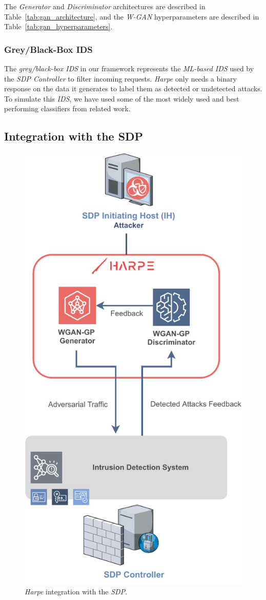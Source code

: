 The \textit{Generator} and \textit{Discriminator} architectures are described in Table~\ref{tab:gan_architecture},
and the \textit{W-GAN} hyperparameters are described in Table~\ref{tab:gan_hyperparameters}.

\subsubsection{Grey/Black-Box IDS}
The \textit{grey/black-box IDS} in our framework represents the \textit{ML-based IDS} used by the
\textit{SDP Controller} to filter incoming requests.
\textit{Harpe} only needs a binary response on the data it generates to label them as detected or undetected attacks.
To simulate this \textit{IDS}, we have used some of the most widely used and best performing classifiers from related
work.

\subsection{Integration with the SDP}\label{subsec:integration-with-the-sdp}

\begin{figure}
    \centering
    \includegraphics[width=.7\columnwidth]{Figures/Harpe-Integration}
    \caption{\label{fig:harpe-sdp-integration} \textit{Harpe} integration with the \textit{SDP}.}
\end{figure}

